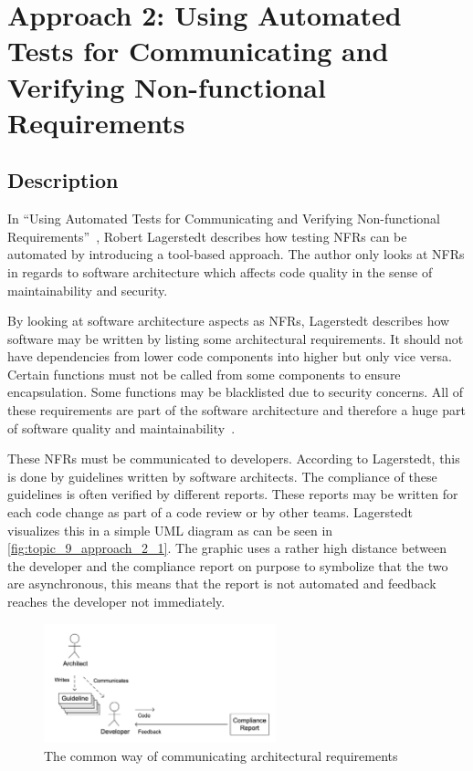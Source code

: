 \newpage

\section{Approach 2: Using Automated Tests for Communicating and Verifying Non-functional Requirements} \label{sec:9_approach_2}

\subsection{Description}

In \enquote{Using Automated Tests for Communicating and Verifying Non-functional Requirements}~\cite{Lagerstedt2014}, Robert Lagerstedt describes how testing NFRs can be automated by introducing a tool-based approach.
The author only looks at NFRs in regards to software architecture which affects code quality in the sense of maintainability and security.

By looking at software architecture aspects as NFRs, Lagerstedt describes how software may be written by listing some architectural requirements.
It should not have dependencies from lower code components into higher but only vice versa.
Certain functions must not be called from some components to ensure encapsulation. Some functions may be blacklisted due to security concerns.
All of these requirements are part of the software architecture and therefore a huge part of software quality and maintainability~\cite{Lagerstedt2014}.

These NFRs must be communicated to developers. According to Lagerstedt, this is done by guidelines written by software architects.
The compliance of these guidelines is often verified by different reports. These reports may be written for each code change as part of a code review or by other teams.
Lagerstedt visualizes this in a simple UML diagram as can be seen in
\autoref{fig:topic_9_approach_2_1}.
The graphic uses a rather high distance between the developer and the compliance report on purpose to symbolize that the two are asynchronous, this means that the report is not automated and feedback reaches the developer not immediately.

\begin{figure}[htbp]
	\centering
	\includegraphics[width=0.6\textwidth]{../images/topic_9_approach_2_1.png}
	\caption{The common way of communicating architectural requirements~\cite{Lagerstedt2014}}
	\label{fig:topic_9_approach_2_1}
\end{figure}

